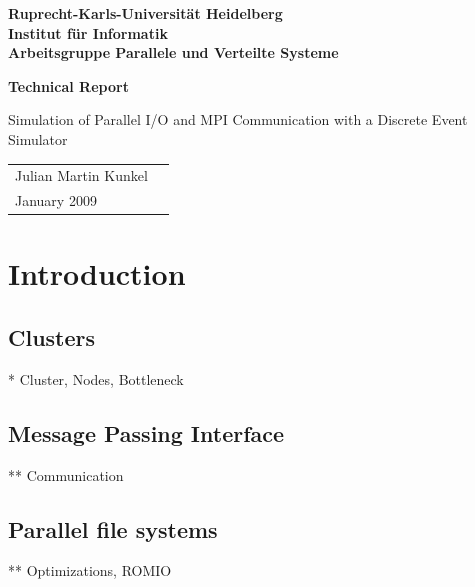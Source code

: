 \documentclass[
     11pt,         %
     a4paper,      %
     BCOR10mm,     %
     DIV14,        %
     liststotoc,   %
     bibtotoc,     %
     idxtotoc,     %
     parskip       %
     ]{scrreprt}   %
\newcommand{\myTitle}[0]{
Simulation of Parallel I/O and MPI Communication with a Discrete Event Simulator
}
\begin{document}
\begin{titlepage}

\vspace*{1cm}
\begin{center}
\textbf{
\Large Ruprecht-Karls-Universität Heidelberg\\
\smallskip
\Large Institut für Informatik\\
\smallskip
\Large Arbeitsgruppe Parallele und Verteilte Systeme\\
\smallskip
}

\vspace{3cm}

\textbf{\large Technical Report} 

\vspace{0.5\baselineskip}
{\huge
\myTitle
}
\end{center}

\vfill

{\large
\begin{tabular}[l]{ll}
Julian Martin Kunkel\\
January 2009
\end{tabular}
}

\end{titlepage}

\tableofcontents

\chapter{Introduction}
\section{Clusters}
* Cluster, Nodes, Bottleneck

\section{Message Passing Interface}
** Communication

\section{Parallel file systems}
** Optimizations, ROMIO
\end{document}
